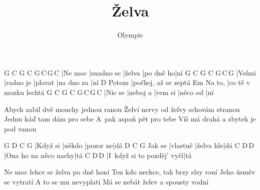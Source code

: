 \documentclass{song}
\title{Želva}
\author{Olympic}
\begin{document}
\strophe
G       C          G      C         G\,C\,G\,C
|Ne moc |snadno se |želva |po dně ho|ní
G      C         G       C          G\,C\,G
|Velmi |radno je |plavat |na dno za |ní
      D
Potom |počkej, až se zeptá
       Em
Na to, |co tě v mozku lechtá
G       C        G       C        G\,C\,G\,C
|Nic se |neboj a |vem si |něco od |ní
\endstrophe

\strophe*
Abych zabil dvě mouchy jednou ranou
Želví nervy od želvy schovám stranou
Jednu káď tam dám pro sebe
A~pak aspoň pět pro tebe
Víš má drahá a zbytek je pod vanou
\endstrophe

G        D      C        G
|Když si |někdo |pozor ne|dá
       D        C         G
Jak se |vlastně |želva hle|dá
C                    D\,D\7
|Ona ho na něco nachy|tá
C                         D\,D\7
|I~když si to pozděj' vyčí|tá
\endstrophe

\strophe*
Ne moc lehce se želva po dně honí
Ten kdo nechce, tak brzy slzy roní
Jeho úsměv se vytratí
A to se mu nevyplatí
Má se nebát želev a spousty vodní
\endstrophe
\end{document}
